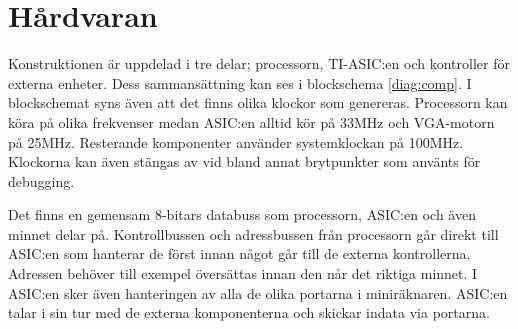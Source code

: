 \documentclass[main.tex]{subfiles}
\begin{document}
\section{Hårdvaran}
Konstruktionen är uppdelad i tre delar; processorn, TI-ASIC:en och kontroller
för externa enheter. Dess sammansättning kan ses i blockschema \ref{diag:comp}.
I blockschemat syns även att det finns olika klockor som genereras. Processorn
kan köra på olika frekvenser medan ASIC:en alltid kör på 33MHz och VGA-motorn
på 25MHz. Resterande komponenter använder systemklockan på 100MHz. Klockorna
kan även stängas av vid bland annat brytpunkter som använts för debugging.

Det finns en gemensam 8-bitars databuss som processorn, ASIC:en och även minnet
delar på. Kontrollbussen och adressbussen från processorn går direkt till
ASIC:en som hanterar de först innan något går till de externa kontrollerna.
Adressen behöver till exempel översättas innan den når det riktiga minnet. I
ASIC:en sker även hanteringen av alla de olika portarna i miniräknaren. ASIC:en
talar i sin tur med de externa komponenterna och skickar indata via portarna.




\end{document}
